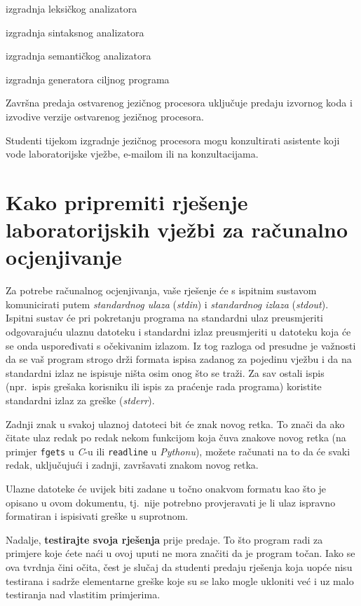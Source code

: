 \documentclass[times, 12pt, utf8]{book}
\begin{document}
\begin{description}
\itemsep 1pt
\item[I laboratorijska cjelina:] izgradnja leksičkog analizatora
\item[II laboratorijska cjelina:] izgradnja sintaksnog analizatora
\item[III laboratorijska cjelina:] izgradnja semantičkog analizatora
\item[IV laboratorijska cjelina:] izgradnja generatora ciljnog programa
\end{description}

Završna predaja ostvarenog jezičnog procesora uključuje predaju izvornog koda i izvodive verzije ostvarenog jezičnog procesora.

Studenti tijekom izgradnje jezičnog procesora mogu konzultirati asistente koji vode laboratorijske vježbe, e-mailom ili na konzultacijama.

\section{Kako pripremiti rješenje laboratorijskih vježbi za računalno ocjenjivanje}
Za potrebe računalnog ocjenjivanja, vaše rješenje će s ispitnim sustavom komunicirati putem \emph{standardnog ulaza} (\emph{stdin}) i \emph{standardnog izlaza} (\emph{stdout}).
Ispitni sustav će pri pokretanju programa na standardni ulaz preusmjeriti odgovarajuću ulaznu datoteku i standardni izlaz preusmjeriti u datoteku koja će se onda uspoređivati s očekivanim izlazom.
Iz tog razloga od presudne je važnosti da se vaš program strogo drži formata ispisa zadanog za pojedinu vježbu i da na standardni izlaz ne ispisuje ništa osim onog što se traži.
Za sav ostali ispis (npr.~ispis grešaka korisniku ili ispis za praćenje rada programa) koristite standardni izlaz za greške (\emph{stderr}).

Zadnji znak u svakoj ulaznoj datoteci bit će znak novog retka.
To znači da ako čitate ulaz redak po redak nekom funkcijom koja čuva znakove novog retka (na primjer \texttt{fgets} u \emph{C}-u ili \texttt{readline} u \emph{Pythonu}), možete računati na to da će svaki redak, uključujući i zadnji, završavati znakom novog retka.

Ulazne datoteke će uvijek biti zadane u točno onakvom formatu kao što je opisano u ovom dokumentu, tj.~nije potrebno provjeravati je li ulaz ispravno formatiran i ispisivati greške u suprotnom.

Nadalje, \textbf{testirajte svoja rješenja} prije predaje.
To što program radi za primjere koje ćete naći u ovoj uputi ne mora značiti da je program točan.
Iako se ova tvrdnja čini očita, čest je slučaj da studenti predaju rješenja koja uopće nisu testirana i sadrže elementarne greške koje su se lako mogle ukloniti već i uz malo testiranja nad vlastitim primjerima.
\end{document}
